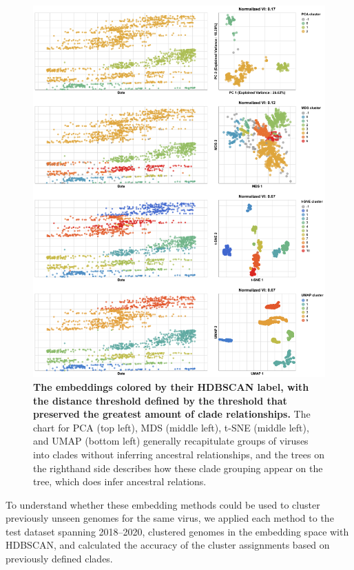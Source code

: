 \documentclass[10pt,letterpaper]{article}
\begin{document}
\begin{figure}[!h]
\includegraphics[width=\columnwidth]{figures/flu-2016-2018-ha-embeddings-by-cluster.png}
\caption{{\bf The embeddings colored by their HDBSCAN label, with the distance threshold defined by the threshold that preserved the greatest amount of clade relationships.}
The chart for PCA (top left), MDS (middle left), t-SNE (middle left), and UMAP (bottom left) generally recapitulate groups of viruses into clades without inferring ancestral relationships, and the trees on the righthand side describes how these clade grouping appear on the tree, which does infer ancestral relations.}
\label{fig:seasonal-influenza-h3n2-ha-2016-2018-clusters}
\end{figure}

To understand whether these embedding methods could be used to cluster previously unseen genomes for the same virus, we applied each method to the test dataset spanning 2018--2020, clustered genomes in the embedding space with HDBSCAN, and calculated the accuracy of the cluster assignments based on previously defined clades.
\end{document}

